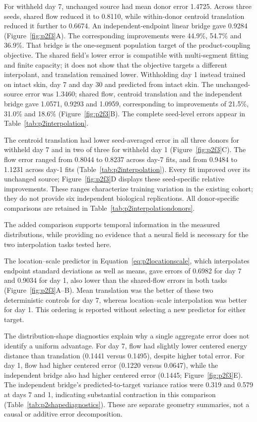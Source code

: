 For withheld day 7, unchanged source had mean donor error 1.4725. Across three seeds, shared flow reduced it to 0.8110, while within-donor centroid translation reduced it further to 0.6674. An independent-endpoint linear bridge gave 0.9284 (Figure~\ref{fig:p2f3}A\label{call:p2f3}). The corresponding improvements were 44.9\%, 54.7\% and 36.9\%. That bridge is the one-segment population target of the product-coupling objective. The shared field's lower error is compatible with multi-segment fitting and finite capacity; it does not show that the objective targets a different interpolant, and translation remained lower. Withholding day 1 instead trained on intact skin, day 7 and day 30 and predicted from intact skin. The unchanged-source error was 1.3460; shared flow, centroid translation and the independent bridge gave 1.0571, 0.9293 and 1.0959, corresponding to improvements of 21.5\%, 31.0\% and 18.6\% (Figure~\ref{fig:p2f3}B). The complete seed-level errors appear in Table~\ref{tab:p2interpolation}.



The centroid translation had lower seed-averaged error in all three donors for withheld day 7 and in two of three for withheld day 1 (Figure~\ref{fig:p2f3}C). The flow error ranged from 0.8044 to 0.8237 across day-7 fits, and from 0.9484 to 1.1231 across day-1 fits (Table~\ref{tab:p2interpolation}). Every fit improved over its unchanged source; Figure~\ref{fig:p2f3}D displays these seed-specific relative improvements. These ranges characterize training variation in the existing cohort; they do not provide six independent biological replications. All donor-specific comparisons are retained in Table~\ref{tab:p2interpolationdonors}.

The added comparison supports temporal information in the measured distributions, while providing no evidence that a neural field is necessary for the two interpolation tasks tested here.

The location--scale predictor in Equation~\eqref{eq:p2locationscale}, which interpolates endpoint standard deviations as well as means, gave errors of 0.6982 for day 7 and 0.9034 for day 1, also lower than the shared-flow errors in both tasks (Figure~\ref{fig:p2f3}A--B). Mean translation was the better of these two deterministic controls for day 7, whereas location--scale interpolation was better for day 1. This ordering is reported without selecting a new predictor for either target.

The distribution-shape diagnostics explain why a single aggregate error does not identify a uniform advantage. For day 7, flow had slightly lower centered energy distance than translation (0.1441 versus 0.1495), despite higher total error. For day 1, flow had higher centered error (0.1220 versus 0.0647), while the independent bridge also had higher centered error (0.1445; Figure~\ref{fig:p2f3}E). The independent bridge's predicted-to-target variance ratios were 0.319 and 0.579 at days 7 and 1, indicating substantial contraction in this comparison (Table~\ref{tab:p2shapediagnostics}). These are separate geometry summaries, not a causal or additive error decomposition.

